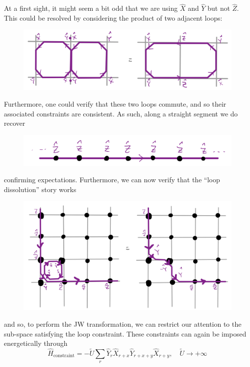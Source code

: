 At a first sight, it might seem a bit odd that we are using $\hat{X}$ and $\hat{Y}$ but not $\hat{Z}$. This could be resolved by considering the product of two adjacent loops:
\begin{figure}[H]
    \centering
    \includegraphics[width=\textwidth]{jupyterbook/data/fig/lec26-fig15.png}
\end{figure}
Furthermore, one could verify that these two loops commute, and so their associated constraints are consistent. As such, along a straight segment we do recover
\begin{figure}[H]
    \centering
    \includegraphics[width=\textwidth]{jupyterbook/data/fig/lec26-fig16.png}
\end{figure}
confirming expectations. Furthermore, we can now verify that the ``loop dissolution'' story works
\begin{figure}[H]
    \centering
    \includegraphics[width=\textwidth]{jupyterbook/data/fig/lec26-fig17.png}
\end{figure}
and so, to perform the JW transformation, we can restrict our attention to the sub-space satisfying the loop constraint. These constraints can again be imposed energetically through
\[ \hat{H}_{\mathrm{constraint}}=-\tilde{U}\sum_r{\hat{Y}_r\hat{X}_{r+x}\hat{Y}_{r+x+y}\hat{X}_{r+y}},\quad \tilde{U}\rightarrow +\infty \]
